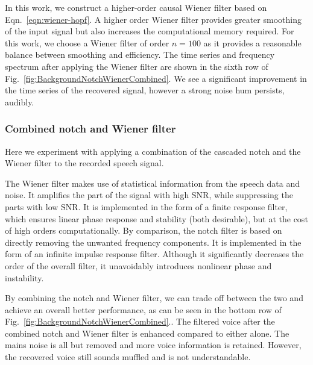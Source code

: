 \documentclass[paper-main.tex]{subfiles}
\begin{document}
In this work, we construct a higher-order causal Wiener filter based on Eqn.~\ref{eqn:wiener-hopf}. A higher order Wiener filter provides greater smoothing of the input signal but also increases the computational memory required. For this work, we choose a Wiener filter of order $n=100$ as it provides a reasonable balance between smoothing and efficiency. The time series and frequency spectrum after applying the Wiener filter are shown in the sixth row of Fig.~\ref{fig:BackgroundNotchWienerCombined}.
We see a significant improvement in the time series of the recovered signal, however a strong noise hum persists, audibly. 


\subsubsection{Combined notch and Wiener filter}

Here we experiment with applying a combination of the cascaded notch and the Wiener filter to the recorded speech signal. 


The Wiener filter makes use of statistical information from the speech data and noise. It amplifies the part of the signal with high SNR, while suppressing the parts with low SNR. It is implemented in the form of a finite response filter, which ensures linear phase response and stability (both desirable), but at the cost of high orders computationally. By comparison, the notch filter is based on directly removing the unwanted frequency components. It is implemented in the form of an infinite impulse response filter. Although it significantly decreases the order of the overall filter, it unavoidably introduces nonlinear phase and instability. 


By combining the notch and Wiener filter, we can trade off between the two and achieve an overall better performance, as can be seen in the bottom row of Fig.~\ref{fig:BackgroundNotchWienerCombined}..
The filtered voice after the combined notch and Wiener filter is enhanced compared to either alone. The mains noise is all but removed and more voice information is retained. However, the recovered voice still sounds muffled and is not understandable.
\end{document}
